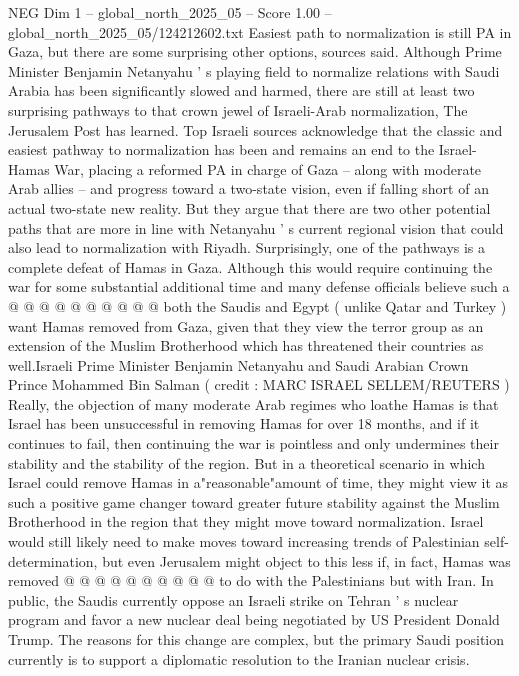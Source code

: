 \begin{textsample}{NEG Dim 1 – global\_north\_2025\_05 – Score 1.00 – global\_north\_2025\_05/124212602.txt}  \label{ex:f1_neg_234}
Easiest path to normalization is still PA in Gaza, but there are some surprising other options, sources said.
Although Prime Minister Benjamin Netanyahu ' s playing field to normalize relations with Saudi Arabia has been significantly slowed and harmed, there are still at least two surprising pathways to that crown jewel of Israeli-Arab normalization, The Jerusalem Post has learned.
Top Israeli sources acknowledge that the classic and easiest pathway to normalization has been and remains an end to the Israel-Hamas War, placing a reformed PA in charge of Gaza -- along with moderate Arab allies -- and progress toward a two-state vision, even if falling short of an actual two-state new reality.
But they argue that there are two other potential paths that are more in line with Netanyahu ' s current regional vision that could also lead to normalization with Riyadh.
Surprisingly, one of the pathways is a complete defeat of Hamas in Gaza.
Although this would require continuing the war for some substantial additional time and many defense officials believe such a @ @ @ @ @ @ @ @ @ @ both the Saudis and Egypt ( unlike Qatar and Turkey ) want Hamas removed from Gaza, given that they view the terror group as an extension of the Muslim Brotherhood which has threatened their countries as well.Israeli Prime Minister Benjamin Netanyahu and Saudi Arabian Crown Prince Mohammed Bin Salman ( credit : MARC ISRAEL SELLEM/REUTERS ) Really, the objection of many moderate Arab regimes who loathe Hamas is that Israel has been unsuccessful in removing Hamas for over 18 months, and if it continues to fail, then continuing the war is pointless and only undermines their stability and the stability of the region.
But in a theoretical scenario in which Israel could remove Hamas in a"reasonable"amount of time, they might view it as such a positive game changer toward greater future stability against the Muslim Brotherhood in the region that they might move toward normalization.
Israel would still likely need to make moves toward increasing trends of Palestinian self-determination, but even Jerusalem might object to this less if, in fact, Hamas was removed @ @ @ @ @ @ @ @ @ @ to do with the Palestinians but with Iran.
In public, the Saudis currently oppose an Israeli strike on Tehran ' s nuclear program and favor a new nuclear deal being negotiated by US President Donald Trump.
The reasons for this change are complex, but the primary Saudi position currently is to support a diplomatic resolution to the Iranian nuclear crisis.

\end{textsample}
